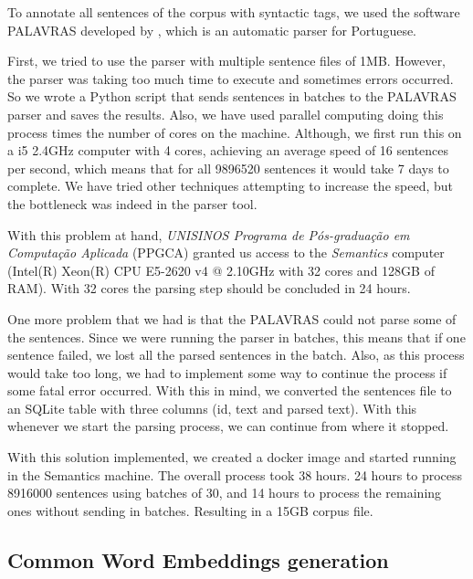 To annotate all sentences of the corpus with syntactic tags, we used the software PALAVRAS developed by , which is an automatic parser for Portuguese.

First, we tried to use the parser with multiple sentence files of 1MB. However, the parser was taking too much time to execute and sometimes errors occurred. So we wrote a Python script that sends sentences in batches to the PALAVRAS parser and saves the results. Also, we have used parallel computing doing this process times the number of cores on the machine. Although, we first run this on a i5 2.4GHz computer with 4 cores, achieving an average speed of 16 sentences per second, which means that for all 9896520 sentences it would take 7 days to complete. We have tried other techniques attempting to increase the speed, but the bottleneck was indeed in the parser tool. 

With this problem at hand, \textit{UNISINOS Programa de Pós-graduação em Computação Aplicada} (PPGCA) granted us access to the \textit{Semantics} computer (Intel(R) Xeon(R) CPU E5-2620 v4 @ 2.10GHz with 32 cores and 128GB of RAM). With 32 cores the parsing step should be concluded in 24 hours.

One more problem that we had is that the PALAVRAS could not parse some of the sentences. Since we were running the parser in batches, this means that if one sentence failed, we lost all the parsed sentences in the batch. Also, as this process would take too long, we had to implement some way to continue the process if some fatal error occurred. With this in mind, we converted the sentences file to an SQLite table with three columns (id, text and parsed text). With this whenever we start the parsing process, we can continue from where it stopped.

With this solution implemented, we created a docker image and started running in the Semantics machine. The overall process took 38 hours. 24 hours to process 8916000 sentences using batches of 30, and 14 hours to process the remaining ones without sending in batches. Resulting in a 15GB corpus file.


\subsection{Common Word Embeddings generation}\label{chap:methodsandmaterials:wegeneration}

